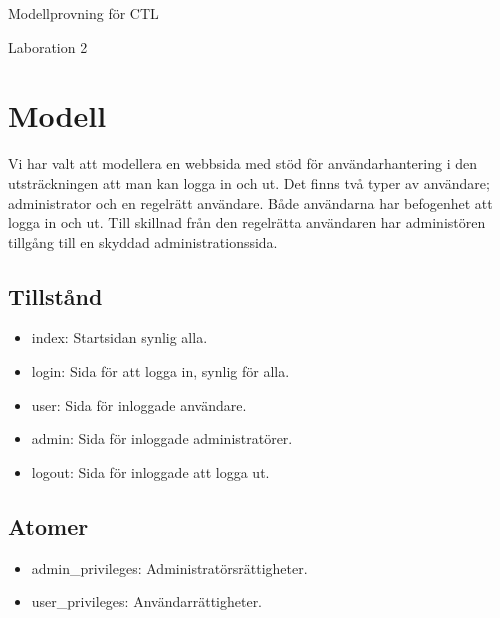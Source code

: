 \documentclass{article}
\begin{document}
\centerline{\sc \large Modellprovning för CTL}
\vspace{.5pc}
\centerline{\sc Laboration 2}
\vspace{2pc}

\section{Modell}
Vi har valt att modellera en webbsida med stöd för användarhantering i den
utsträckningen att man kan logga in och ut. Det finns två typer av användare;
administrator och en regelrätt användare. Både användarna har befogenhet att
logga in och ut. Till skillnad från den regelrätta användaren har administören
tillgång till en skyddad administrationssida.

\subsection{Tillstånd}

\begin{itemize}

\item index: Startsidan synlig alla.
\item login: Sida för att logga in, synlig för alla.
\item user: Sida för inloggade användare.
\item admin: Sida för inloggade administratörer. 
\item logout: Sida för inloggade att logga ut. 

\end{itemize}

\subsection{Atomer}

\begin{itemize}

\item admin\_privileges: Administratörsrättigheter.
\item user\_privileges: Användarrättigheter.

\end{itemize}
\end{document}
